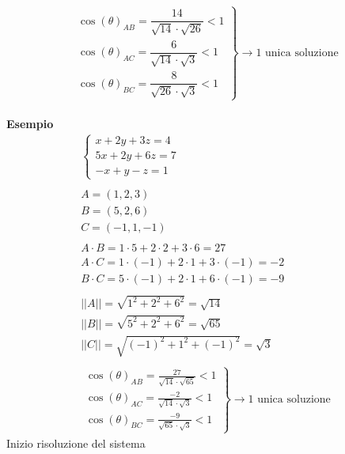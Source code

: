 \documentclass[italian]{article}
\begin{document}
\[
	\left.
	\begin{aligned}
		\cos (\theta)_{AB} = \dfrac{14}{\sqrt{14}\cdot \sqrt{26}} < 1 \\
		\cos (\theta)_{AC} = \dfrac{6}{\sqrt{14}\cdot \sqrt{3}}  < 1  \\
		\cos (\theta)_{BC} = \dfrac{8}{\sqrt{26}\cdot \sqrt{3}}  < 1
	\end{aligned}
	\right\rbrace \to \text{1 unica soluzione}
\]
\pagebreak\\
\textbf{Esempio}\\
\begin{gather*}
	\begin{cases*}
		x+2y+3z=4\\
		5x+2y+6z=7\\
		-x+y-z=1
	\end{cases*}\\\\
	A = (1,2,3)\\
	B = (5,2,6)\\
	C = (-1,1,-1)\\\\
	A\cdot B = 1\cdot 5 + 2\cdot 2 + 3 \cdot 6 = 27\\
	A\cdot C = 1\cdot (-1) + 2\cdot 1 + 3 \cdot (-1) = -2\\
	B\cdot C = 5\cdot (-1) + 2\cdot 1 + 6 \cdot (-1) = -9\\\\
	||A|| = \sqrt{1^2 + 2^2 + 6^2} = \sqrt{14}\\
	||B|| = \sqrt{5^2 + 2^2 + 6^2} = \sqrt{65}\\
	||C|| = \sqrt{(-1)^2+1^2+(-1)^2} = \sqrt{3}\\\\
	\left.
		\begin{aligned}
			\cos (\theta)_{AB} = \frac{27}{\sqrt{14}\cdot \sqrt{65}} < 1 \\
			\cos (\theta)_{AC} = \frac{-2}{\sqrt{14}\cdot \sqrt{3}}  < 1  \\
			\cos (\theta)_{BC} = \frac{-9}{\sqrt{65}\cdot \sqrt{3}}  < 1
		\end{aligned}
	\right\rbrace \to \text{1 unica soluzione}
\end{gather*}
Inizio risoluzione del sistema
\end{document}
